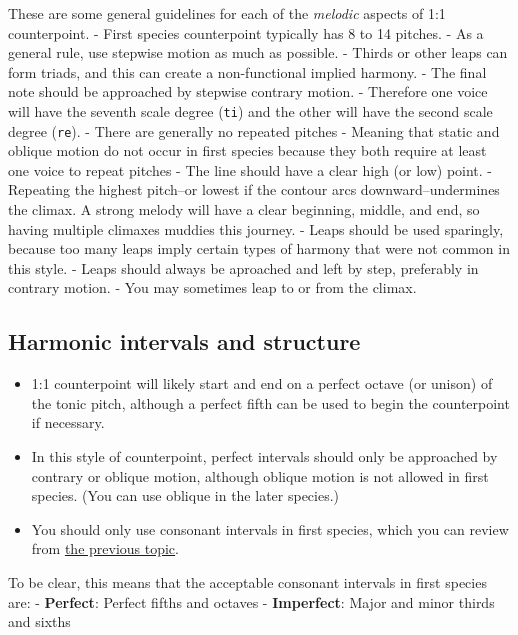 \documentclass{book}
\providecommand{\tightlist}{%
  \setlength{\itemsep}{0pt}\setlength{\parskip}{0pt}}
\begin{document}
These are some general guidelines for each of the \emph{melodic} aspects of
1:1 counterpoint. - First species counterpoint typically has 8 to 14 pitches.
- As a general rule, use stepwise motion as much as possible. - Thirds or
other leaps can form triads, and this can create a non-functional implied
harmony. - The final note should be approached by stepwise contrary motion. -
Therefore one voice will have the seventh scale degree (\texttt{ti}) and the
other will have the second scale degree (\texttt{re}). - There are generally
no repeated pitches - Meaning that static and oblique motion do not occur in
first species because they both require at least one voice to repeat pitches -
The line should have a clear high (or low) point. - Repeating the highest
pitch--or lowest if the contour arcs downward--undermines the climax. A strong
melody will have a clear beginning, middle, and end, so having multiple
climaxes muddies this journey. - Leaps should be used sparingly, because too
many leaps imply certain types of harmony that were not common in this style.
- Leaps should always be aproached and left by step, preferably in contrary
motion. - You may sometimes leap to or from the climax.

\hypertarget{harmonic-intervals-and-structure}{%
\subsection{Harmonic intervals and
structure}\label{harmonic-intervals-and-structure}}

\begin{itemize}
\tightlist
\item
  1:1 counterpoint will likely start and end on a perfect octave (or unison)
  of the tonic pitch, although a perfect fifth can be used to begin the
  counterpoint if necessary.
\item
  In this style of counterpoint, perfect intervals should only be approached
  by contrary or oblique motion, although oblique motion is not allowed in
  first species. (You can use oblique in the later species.)
\item
  You should only use consonant intervals in first species, which you can
  review from
  \href{\%7B\%7B\%20site.baseurl\%20\%7D\%7D\%20/05-counterpoint-embell-shapes/a2-introcounterpoint.html}{the
  previous topic}.
\end{itemize}

To be clear, this means that the acceptable consonant intervals in first
species are: - \textbf{Perfect}: Perfect fifths and octaves -
\textbf{Imperfect}: Major and minor thirds and sixths
\end{document}
